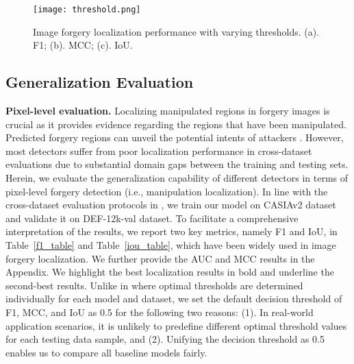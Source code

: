 \documentclass[10pt,journal,compsoc]{IEEEtran}
\begin{document}
\begin{figure*}[ht]
\centering
\texttt{[image:  threshold.png]}
\caption{Image forgery localization performance with varying thresholds. (a). F1; (b). MCC; (c). IoU.}
\label{threshold}
\end{figure*}

\subsection{Generalization Evaluation} 
\noindent\textbf{Pixel-level evaluation.} Localizing manipulated regions in forgery images is crucial as it provides evidence regarding the regions that have been manipulated. Predicted forgery regions can unveil the potential intents of attackers \cite{kong2022detect}. However, most detectors suffer from poor localization performance in cross-dataset evaluations due to substantial domain gaps between the training and testing sets. Herein, we evaluate the generalization capability of different detectors in terms of pixel-level forgery detection (i.e., manipulation localization).
In line with the cross-dataset evaluation protocols in \cite{dong2022mvss}, we train our model on CASIAv2 \cite{Dong2013} dataset and validate it on DEF-12k-val \cite{mahfoudi2019defacto} dataset. To facilitate a comprehensive interpretation of the results, we report two key metrics, namely F1 and IoU, in Table~\ref{f1_table} and Table~\ref{iou_table}, which have been widely used in image forgery localization. We further provide the AUC and MCC results in the Appendix. We highlight the best localization results in bold and underline the second-best results. Unlike in \cite{dong2022mvss} where optimal thresholds are determined individually for each model and dataset, we set the default decision threshold of F1, MCC, and IoU as 0.5 for the following two reasons: (1). In real-world application scenarios, it is unlikely to predefine different optimal threshold values for each testing data sample, and (2). Unifying the decision threshold as 0.5 enables us to compare all baseline models fairly. 
\end{document}
